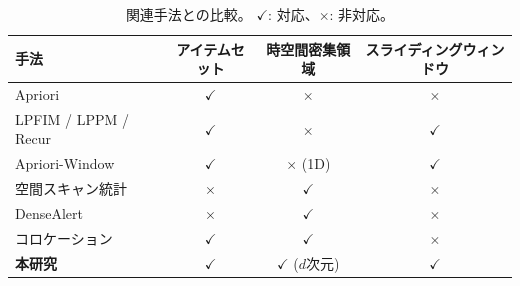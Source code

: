 \begin{table}[t]
\centering
\caption{関連手法との比較。
$\checkmark$: 対応、$\times$: 非対応。}
\label{tab:related}
\small
\begin{tabular}{lccc}
\toprule
手法 & アイテムセット & 時空間密集領域 & スライディングウィンドウ \\
\midrule
Apriori~\cite{agrawal1994apriori}               & $\checkmark$ & $\times$     & $\times$     \\
LPFIM / LPPM / Recur                            & $\checkmark$ & $\times$     & $\checkmark$ \\
Apriori-Window~\cite{aprioriwindow}             & $\checkmark$ & $\times$ (1D) & $\checkmark$ \\
空間スキャン統計~\cite{kulldorff1997spatial}     & $\times$     & $\checkmark$ & $\times$     \\
DenseAlert~\cite{shin2017densealert}             & $\times$     & $\checkmark$ & $\times$     \\
コロケーション~\cite{shekhar2001colocation}      & $\checkmark$ & $\checkmark$ & $\times$     \\
\midrule
\textbf{本研究}                                  & $\checkmark$ & $\checkmark$ ($d$次元) & $\checkmark$ \\
\bottomrule
\end{tabular}
\end{table}
